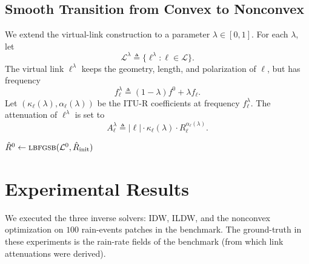 \documentclass[a4paper,fleqn]{cas-sc}
\DeclareRobustCommand{\Homotopy}{\textsc{Homotopy-Solver}}
\DeclareRobustCommand{\LBFGSB}{\textsc{lbfgsb}}
\begin{document}
\subsection{Smooth Transition from Convex to Nonconvex}

We extend the virtual-link construction to a parameter $\lambda\in[0,1]$.
For each $\lambda$, let
\[
  \mathcal{L}^{\lambda}\triangleq \{\ell^{\lambda}:\ell\in\mathcal{L}\}.
\]
The virtual link $\ell^{\lambda}$ keeps the geometry, length, and polarization of $\ell$, but has frequency
\[
  f_\ell^{\lambda}\triangleq (1-\lambda)f^0+\lambda f_\ell .
\]
Let $(\kappa_\ell(\lambda),\alpha_\ell(\lambda))$ be the ITU-R coefficients at frequency $f_\ell^{\lambda}$.
The attenuation of $\ell^\lambda$ is set to
\[
  A_\ell^{\lambda}\triangleq |\ell|\cdot \kappa_\ell(\lambda) \cdot R_\ell^{\alpha_\ell(\lambda)} .
\]



\begin{algorithm}[H]
  \caption{\Homotopy - a solver that applies a smooth transition from convex optimization to optimizing the nonconvex objective. Assume the same polarization for all the links.}
  \label{alg:homotopy}
  \DontPrintSemicolon

  $\hat{R}^0 \gets \LBFGSB(\mathcal{L}^0,\hat{R}_{\mathrm{init}})$\;
  \For{$\lambda=\delta,\;2\delta,\;\ldots,\;1$}{
    $\hat{R}^\lambda \gets \LBFGSB(\mathcal{L}^{\lambda},\hat{R}^{\lambda-\delta})$\;
  }
  \;
\end{algorithm}




%
\section{Experimental Results}
We executed the three inverse solvers: IDW, ILDW, and the nonconvex optimization on $100$ rain-events patches in the benchmark.
The ground-truth in these experiments is the rain-rate fields of the benchmark (from which link attenuations were derived).
\end{document}
